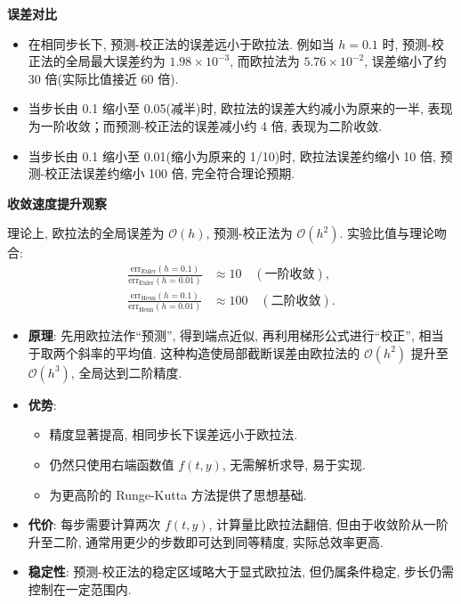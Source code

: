 \documentclass[zihao=-4,a4paper]{ctexart}
\begin{document}
\noindent\textbf{误差对比}
\begin{itemize}[rightmargin=0.5cm]
    \item 在相同步长下, 预测-校正法的误差远小于欧拉法. 例如当 $h=0.1$ 时, 预测-校正法的全局最大误差约为 $1.98\times10^{-3}$, 而欧拉法为 $5.76\times10^{-2}$, 误差缩小了约 30 倍(实际比值接近 60 倍). 
    \item 当步长由 0.1 缩小至 0.05(减半)时, 欧拉法的误差大约减小为原来的一半, 表现为一阶收敛；而预测-校正法的误差减小约 4 倍, 表现为二阶收敛. 
    \item 当步长由 0.1 缩小至 0.01(缩小为原来的 1/10)时, 欧拉法误差约缩小 10 倍, 预测-校正法误差约缩小 100 倍, 完全符合理论预期. 
\end{itemize}

\noindent \textbf{收敛速度提升观察}

理论上, 欧拉法的全局误差为 $\mathcal{O}(h)$, 预测-校正法为 $\mathcal{O}(h^2)$. 实验比值与理论吻合: 
\begin{align*}
    \frac{\text{err}_\text{Euler}(h=0.1)}{\text{err}_\text{Euler}(h=0.01)} &\approx 10 \quad(\text{一阶收敛}), \\
    \frac{\text{err}_\text{Heun}(h=0.1)}{\text{err}_\text{Heun}(h=0.01)} &\approx 100 \quad(\text{二阶收敛}).
\end{align*}


\begin{itemize}[rightmargin=0.5cm]
    \item \textbf{原理}: 先用欧拉法作“预测”, 得到端点近似, 再利用梯形公式进行“校正”, 相当于取两个斜率的平均值. 这种构造使局部截断误差由欧拉法的 $\mathcal{O}(h^2)$ 提升至 $\mathcal{O}(h^3)$, 全局达到二阶精度. 
    \item \textbf{优势}: 
    \begin{itemize}
        \item 精度显著提高, 相同步长下误差远小于欧拉法. 
        \item 仍然只使用右端函数值 $f(t,y)$, 无需解析求导, 易于实现. 
        \item 为更高阶的 Runge-Kutta 方法提供了思想基础. 
    \end{itemize}
    \item \textbf{代价}: 每步需要计算两次 $f(t,y)$, 计算量比欧拉法翻倍, 但由于收敛阶从一阶升至二阶, 通常用更少的步数即可达到同等精度, 实际总效率更高. 
    \item \textbf{稳定性}: 预测-校正法的稳定区域略大于显式欧拉法, 但仍属条件稳定, 步长仍需控制在一定范围内. 
\end{itemize}
\end{document}
